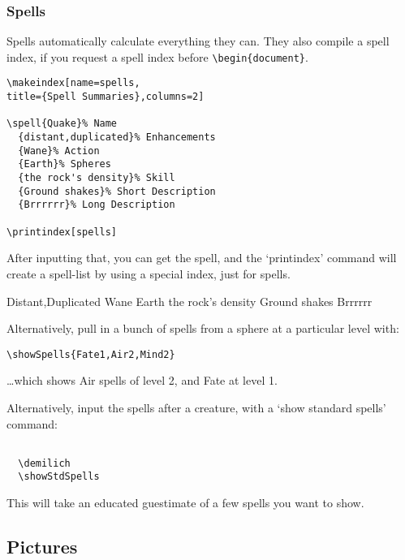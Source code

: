 \documentclass[a4paper,openany]{book}
\begin{document}
\begin{multicols}{2}
\subsubsection{Spells}

Spells automatically calculate everything they can.
They also compile a spell index, if you request a spell index before \verb"\begin{document}".

\begin{verbatim}
\makeindex[name=spells,
title={Spell Summaries},columns=2]

\spell{Quake}% Name
  {distant,duplicated}% Enhancements
  {Wane}% Action
  {Earth}% Spheres
  {the rock's density}% Skill
  {Ground shakes}% Short Description
  {Brrrrrr}% Long Description

\printindex[spells]
\end{verbatim}

After inputting that, you can get the spell, and the `printindex' command will create a spell-list by using a special index, just for spells.

  {Distant,Duplicated}%
  {Wane}%
  {Earth}%
  {the rock's density}%
  {Ground shakes}%
  {Brrrrrr}%

Alternatively, pull in a bunch of spells from a sphere at a particular level with:

\verb"\showSpells{Fate1,Air2,Mind2}"


\ldots which shows Air spells of level 2, and Fate at level 1.

Alternatively, input the spells after a creature, with a `show standard spells' command:

\begin{verbatim}

  \demilich
  \showStdSpells

\end{verbatim}

This will take an educated guestimate of a few spells you want to show.

\demilich

\showStdSpells

\subsection{Pictures}



\end{multicols}
\end{document}
